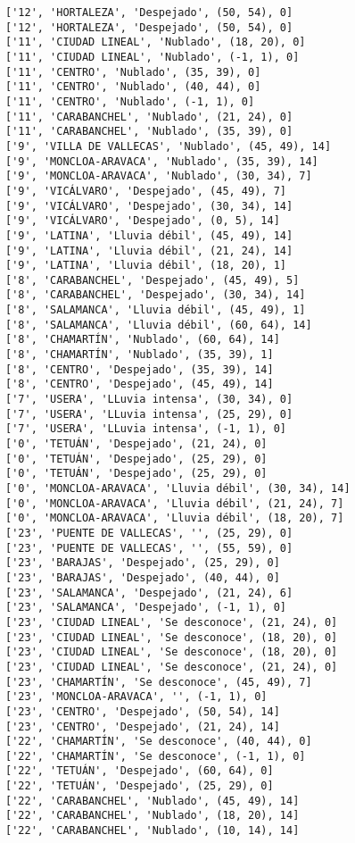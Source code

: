 \documentclass[11pt]{article}
\begin{document}
\begin{Verbatim}[commandchars=\\\{\}]
['12', 'HORTALEZA', 'Despejado', (50, 54), 0]
['12', 'HORTALEZA', 'Despejado', (50, 54), 0]
['11', 'CIUDAD LINEAL', 'Nublado', (18, 20), 0]
['11', 'CIUDAD LINEAL', 'Nublado', (-1, 1), 0]
['11', 'CENTRO', 'Nublado', (35, 39), 0]
['11', 'CENTRO', 'Nublado', (40, 44), 0]
['11', 'CENTRO', 'Nublado', (-1, 1), 0]
['11', 'CARABANCHEL', 'Nublado', (21, 24), 0]
['11', 'CARABANCHEL', 'Nublado', (35, 39), 0]
['9', 'VILLA DE VALLECAS', 'Nublado', (45, 49), 14]
['9', 'MONCLOA-ARAVACA', 'Nublado', (35, 39), 14]
['9', 'MONCLOA-ARAVACA', 'Nublado', (30, 34), 7]
['9', 'VICÁLVARO', 'Despejado', (45, 49), 7]
['9', 'VICÁLVARO', 'Despejado', (30, 34), 14]
['9', 'VICÁLVARO', 'Despejado', (0, 5), 14]
['9', 'LATINA', 'Lluvia débil', (45, 49), 14]
['9', 'LATINA', 'Lluvia débil', (21, 24), 14]
['9', 'LATINA', 'Lluvia débil', (18, 20), 1]
['8', 'CARABANCHEL', 'Despejado', (45, 49), 5]
['8', 'CARABANCHEL', 'Despejado', (30, 34), 14]
['8', 'SALAMANCA', 'Lluvia débil', (45, 49), 1]
['8', 'SALAMANCA', 'Lluvia débil', (60, 64), 14]
['8', 'CHAMARTÍN', 'Nublado', (60, 64), 14]
['8', 'CHAMARTÍN', 'Nublado', (35, 39), 1]
['8', 'CENTRO', 'Despejado', (35, 39), 14]
['8', 'CENTRO', 'Despejado', (45, 49), 14]
['7', 'USERA', 'LLuvia intensa', (30, 34), 0]
['7', 'USERA', 'LLuvia intensa', (25, 29), 0]
['7', 'USERA', 'LLuvia intensa', (-1, 1), 0]
['0', 'TETUÁN', 'Despejado', (21, 24), 0]
['0', 'TETUÁN', 'Despejado', (25, 29), 0]
['0', 'TETUÁN', 'Despejado', (25, 29), 0]
['0', 'MONCLOA-ARAVACA', 'Lluvia débil', (30, 34), 14]
['0', 'MONCLOA-ARAVACA', 'Lluvia débil', (21, 24), 7]
['0', 'MONCLOA-ARAVACA', 'Lluvia débil', (18, 20), 7]
['23', 'PUENTE DE VALLECAS', '', (25, 29), 0]
['23', 'PUENTE DE VALLECAS', '', (55, 59), 0]
['23', 'BARAJAS', 'Despejado', (25, 29), 0]
['23', 'BARAJAS', 'Despejado', (40, 44), 0]
['23', 'SALAMANCA', 'Despejado', (21, 24), 6]
['23', 'SALAMANCA', 'Despejado', (-1, 1), 0]
['23', 'CIUDAD LINEAL', 'Se desconoce', (21, 24), 0]
['23', 'CIUDAD LINEAL', 'Se desconoce', (18, 20), 0]
['23', 'CIUDAD LINEAL', 'Se desconoce', (18, 20), 0]
['23', 'CIUDAD LINEAL', 'Se desconoce', (21, 24), 0]
['23', 'CHAMARTÍN', 'Se desconoce', (45, 49), 7]
['23', 'MONCLOA-ARAVACA', '', (-1, 1), 0]
['23', 'CENTRO', 'Despejado', (50, 54), 14]
['23', 'CENTRO', 'Despejado', (21, 24), 14]
['22', 'CHAMARTÍN', 'Se desconoce', (40, 44), 0]
['22', 'CHAMARTÍN', 'Se desconoce', (-1, 1), 0]
['22', 'TETUÁN', 'Despejado', (60, 64), 0]
['22', 'TETUÁN', 'Despejado', (25, 29), 0]
['22', 'CARABANCHEL', 'Nublado', (45, 49), 14]
['22', 'CARABANCHEL', 'Nublado', (18, 20), 14]
['22', 'CARABANCHEL', 'Nublado', (10, 14), 14]

\end{Verbatim}
\end{document}
